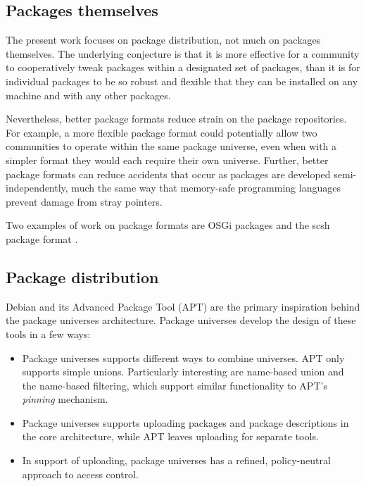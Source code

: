 \documentclass{article}
\begin{document}
\subsection{Packages themselves}
The present work focuses on package distribution, not much on packages
themselves.  The underlying conjecture is that it is more effective
for a community to cooperatively tweak packages within a designated
set of packages, than it is for individual packages to be so robust
and flexible that they can be installed on any machine and with any
other packages.


Nevertheless, better package formats reduce strain on the package
repositories.  For example, a more flexible package format could
potentially allow two communities to operate within the same package
universe, even when with a simpler format they would each require
their own universe.  Further, better package formats can reduce
accidents that occur as packages are developed semi-independently,
much the same way that memory-safe programming languages prevent
damage from stray pointers.

Two examples of work on package formats are OSGi packages
\cite{osgi03:book, osgi:web} and the scsh package format
\cite{schinz05:scsh}.


\subsection{Package distribution}



Debian and its Advanced Package Tool (APT) \cite{apt:howto}
are the primary inspiration behind the package universes architecture.
Package universes develop the design of these tools in a few ways:
\begin{itemize}
\item Package universes supports different ways to combine universes.
      APT only supports simple unions.  Particularly interesting are
      name-based union and the name-based filtering, which support
      similar functionality to APT's \emph{pinning} mechanism.

\item Package universes supports uploading packages and package
      descriptions in the core architecture, while APT leaves
      uploading for separate tools.

\item In support of uploading, package universes has a refined,
      policy-neutral approach to access control.
\end{itemize}
\end{document}
